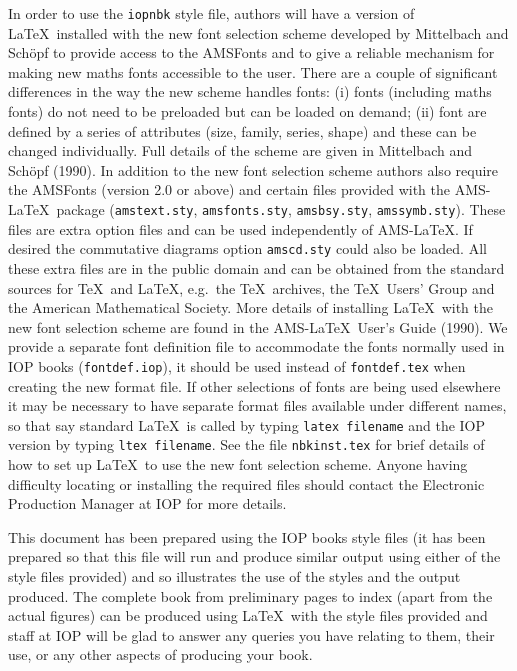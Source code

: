 In order to use the \verb"iopnbk" style file,
authors will have a version of \LaTeX\ installed with the new font
selection scheme 
developed by Mittelbach and Sch\"opf to provide access to 
the AMSFonts and to give a reliable mechanism for making new maths fonts
accessible to the user. There are a couple of significant differences in
the way the new scheme handles fonts: (i) fonts (including maths fonts)
do not need to be preloaded but can be loaded on demand; (ii)
font are defined by a series of attributes (size, family, series, shape)
and these can be changed individually. Full details of the scheme are
given in Mittelbach and Sch\"opf (1990). In addition to the new font
selection scheme authors also require the AMSFonts 
(version 2.0 or above)
and certain files provided with the AMS-\LaTeX\ package
(\verb"amstext.sty", \verb"amsfonts.sty", \verb"amsbsy.sty",
\verb"amssymb.sty"). These files are extra option files and can be used
independently of AMS-\LaTeX. If desired the commutative diagrams option 
\verb"amscd.sty" could also be loaded. All these extra files are in the
public domain and can be obtained from the standard sources for \TeX\ and
\LaTeX, e.g.\ the \TeX\ archives, the \TeX\ Users' Group and the American
Mathematical Society. 
More details of installing \LaTeX\ with the new font selection scheme are
found in the AMS-\LaTeX\ User's Guide (1990). We provide a separate
font definition file to accommodate the fonts normally used in IOP
books (\verb"fontdef.iop"), it should be used instead of 
\verb"fontdef.tex" when creating the new format file.
If other selections of fonts are being used elsewhere it may be necessary
to have separate format files available under different names, so that say 
standard \LaTeX\ is called by typing \verb"latex filename" and the IOP
version by typing \verb"ltex filename".  See the file 
\verb"nbkinst.tex" for
brief details of how to set up \LaTeX\ to use the new font selection
scheme. 
Anyone having difficulty locating or installing the required files
should contact the Electronic Production Manager at IOP for more details.

This document has been prepared using the IOP books style files 
(it has been prepared so that this file will run and produce
similar output using either of the style files provided)
and so illustrates the use of the styles and the output produced. 
The complete book from 
preliminary pages to index (apart from the actual figures) can be 
produced using \LaTeX\ with the style files provided and staff at IOP 
will be glad to answer any queries you have relating to them, 
their use, or any other aspects of producing your book.

